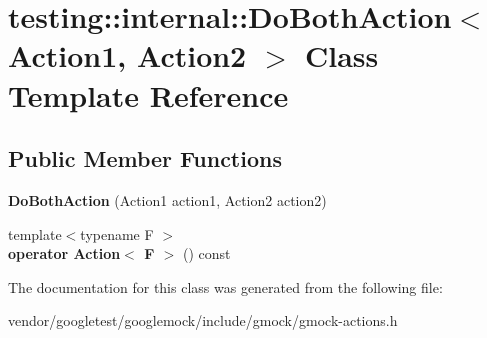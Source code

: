 \hypertarget{classtesting_1_1internal_1_1_do_both_action}{}\section{testing\+:\+:internal\+:\+:Do\+Both\+Action$<$ Action1, Action2 $>$ Class Template Reference}
\label{classtesting_1_1internal_1_1_do_both_action}
\subsection*{Public Member Functions}
\begin{DoxyCompactItemize}
\item 
\mbox{\label{classtesting_1_1internal_1_1_do_both_action_a55727c4dbdc1816ba6f1fe124e96088b}} 
{\bfseries Do\+Both\+Action} (Action1 action1, Action2 action2)
\item 
\mbox{\label{classtesting_1_1internal_1_1_do_both_action_a35733e2f117daad110bfbd3de84634a6}} 
{\footnotesize template$<$typename F $>$ }\\{\bfseries operator Action$<$ F $>$} () const
\end{DoxyCompactItemize}


The documentation for this class was generated from the following file\+:\begin{DoxyCompactItemize}
\item 
vendor/googletest/googlemock/include/gmock/gmock-\/actions.\+h\end{DoxyCompactItemize}
